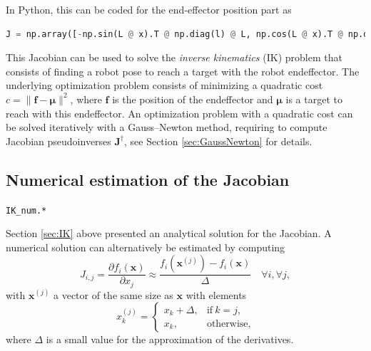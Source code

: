 \documentclass[10pt,a4paper]{article} %
\newcommand{\psin}{{\dagger}}
\newcommand{\filename}[1]{\colorbox{rr2}{\color{white}\texttt{#1}}}
\begin{document}

In Python, this can be coded for the end-effector position part as
\begin{lstlisting}[language=Python,linewidth=\textwidth]
J = np.array([-np.sin(L @ x).T @ np.diag(l) @ L, np.cos(L @ x).T @ np.diag(l) @ L]) #Jacobian (for end-effector)
\end{lstlisting}

This Jacobian can be used to solve the \emph{inverse kinematics} (IK) problem that consists of finding a robot pose to reach a target with the robot endeffector. The underlying optimization problem consists of minimizing a quadratic cost $c=\|\bm{f}-\bm{\mu}\|^2$, where $\bm{f}$ is the position of the endeffector and $\bm{\mu}$ is a target to reach with this endeffector. An optimization problem with a quadratic cost can be solved iteratively with a Gauss--Newton method, requiring to compute Jacobian pseudoinverses $\bm{J}^\psin$, see Section \ref{sec:GaussNewton} for details.


\subsection{Numerical estimation of the Jacobian}\label{sec:IKnum}
\begin{flushright}
\filename{IK\_num.*}
\end{flushright}

Section \ref{sec:IK} above presented an analytical solution for the Jacobian. A numerical solution can alternatively be estimated by computing
\begin{equation*}
	J_{i,j} = \frac{\partial f_i(\bm{x})}{\partial x_j} \approx \frac{f_i(\bm{x}^{(j)}) - f_i(\bm{x})}{\Delta} \quad \forall i, \forall j,
\end{equation*}
with $\bm{x}^{(j)}$ a vector of the same size as $\bm{x}$ with elements
\begin{equation*}
	x^{(j)}_k = 
	\begin{cases} 
	x_k + \Delta, & \text{if}\ k=j, \\
	x_k, & \text{otherwise}, 
	\end{cases}
\end{equation*}
where $\Delta$ is a small value for the approximation of the derivatives.
\end{document}
